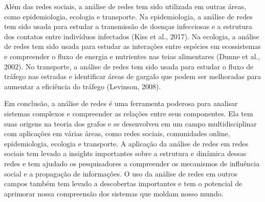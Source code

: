 Além das redes sociais, a análise de redes tem sido utilizada em outras áreas, como epidemiologia, ecologia e transporte. Na epidemiologia, a análise de redes tem sido usada para estudar a transmissão de doenças infecciosas e a estrutura dos contatos entre indivíduos infectados (Kiss et al., 2017). Na ecologia, a análise de redes tem sido usada para estudar as interações entre espécies em ecossistemas e compreender o fluxo de energia e nutrientes nas teias alimentares (Dunne et al., 2002). No transporte, a análise de redes tem sido usada para estudar o fluxo de tráfego nas estradas e identificar áreas de gargalo que podem ser melhoradas para aumentar a eficiência do tráfego (Levinson, 2008).

Em conclusão, a análise de redes é uma ferramenta poderosa para analisar sistemas complexos e compreender as relações entre seus componentes. Ela tem suas origens na teoria dos grafos e se desenvolveu em um campo multidisciplinar com aplicações em várias áreas, como redes sociais, comunidades online, epidemiologia, ecologia e transporte. A aplicação da análise de redes em redes sociais tem levado a insights importantes sobre a estrutura e dinâmica dessas redes e tem ajudado os pesquisadores a compreender os mecanismos de influência social e a propagação de informações. O uso da análise de redes em outros campos também tem levado a descobertas importantes e tem o potencial de aprimorar nossa compreensão dos sistemas que moldam nosso mundo.